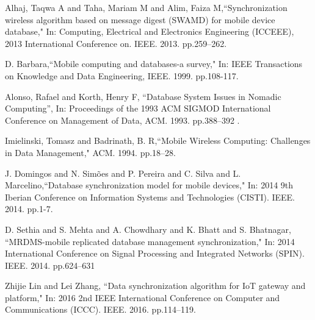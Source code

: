 \documentclass[conference]{IEEEtran}
\begin{document}
\begin{thebibliography}{00}

Alhaj, Taqwa A and Taha, Mariam M and Alim, Faiza M,``Synchronization wireless algorithm based on message digest (SWAMD) for mobile device database," In: Computing, Electrical and Electronics Engineering (ICCEEE), 2013 International Conference on. IEEE. 2013. pp.259--262.

D. Barbara,``Mobile computing and databases-a survey," In: IEEE Transactions on Knowledge and Data Engineering, IEEE. 1999. pp.108-117.

Alonso, Rafael and Korth, Henry F, ``Database System Issues in Nomadic Computing'', In: Proceedings of the 1993 ACM SIGMOD International Conference on Management of Data, ACM. 1993. pp.388--392 .

Imielinski, Tomasz and Badrinath, B. R,``Mobile Wireless Computing: Challenges in Data Management," ACM. 1994. pp.18--28.

J. Domingos and N. Simões and P. Pereira and C. Silva and L. Marcelino,``Database synchronization model for mobile devices," In: 2014 9th Iberian Conference on Information Systems and Technologies (CISTI). IEEE. 2014. pp.1-7.

D. Sethia and S. Mehta and A. Chowdhary and K. Bhatt and S. Bhatnagar, ``MRDMS-mobile replicated database management synchronization," In: 2014 International Conference on Signal Processing and Integrated Networks (SPIN). IEEE. 2014. pp.624--631

Zhijie Lin and Lei Zhang, ``Data synchronization algorithm for IoT gateway and platform," In: 2016 2nd IEEE International Conference on Computer and Communications (ICCC). IEEE. 2016. pp.114--119.

\end{thebibliography}
 
\end{document}
